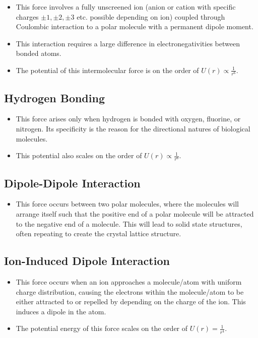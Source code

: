 \documentclass[12pt, letterpaper, twoside]{article}
\begin{document}
\begin{itemize}
    \item This force involves a fully unscreened ion (anion or cation with
    specific charges $\pm1, \pm2, \pm3$ etc. possible depending on ion) coupled through Coulombic interaction to a polar molecule with a permanent dipole moment.
    \item This interaction requires a large difference in electronegativities between bonded atoms.
    \item The potential of this intermolecular force is on the order of $U(r) \propto \frac{1}{r^6}$.
\end{itemize}

\subsection{Hydrogen Bonding}

\begin{itemize}
    \item This force arises only when hydrogen is bonded with oxygen, fluorine, or nitrogen. Its specificity is the reason for the directional natures of biological molecules.
    \item This potential also scales on the order of $U(r) \propto \frac{1}{r^6}$.
\end{itemize}

\subsection{Dipole-Dipole Interaction}

\begin{itemize}
    \item This force occurs between two polar molecules, where the molecules will arrange itself such that the positive end of a polar molecule will be attracted to the negative end of a molecule. This will lead to solid state structures, often repeating to create the crystal lattice structure.
\end{itemize}
\subsection{Ion-Induced Dipole Interaction}

\begin{itemize}
    \item This force occurs when an ion approaches a molecule/atom with uniform charge distribution, causing the electrons within the molecule/atom to be either attracted to or repelled by depending on the charge of the ion. This induces a dipole in the atom.
    \item The potential energy of this force scales on the order of $U(r) = \frac{1}{r^4}$.
\end{itemize}
\end{document}
